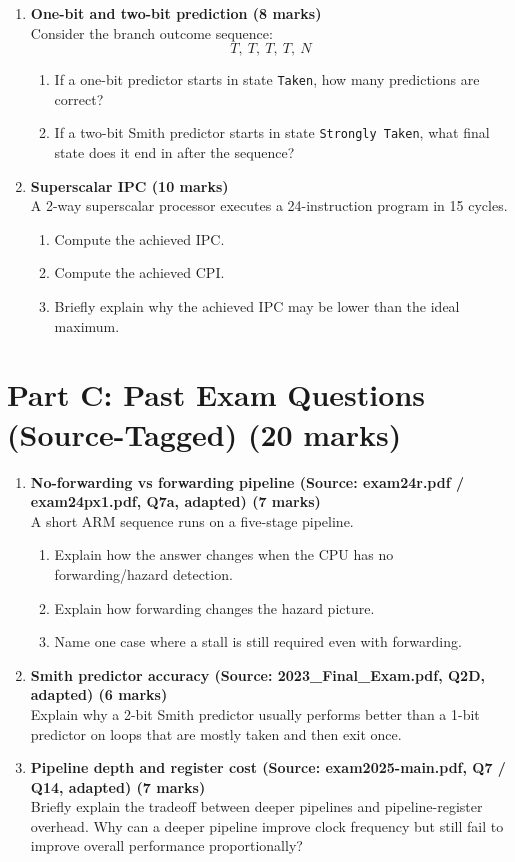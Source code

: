 \documentclass[11pt]{article}
\begin{document}
\begin{enumerate}[label=\textbf{B\arabic*.}]
  \item \textbf{One-bit and two-bit prediction (8 marks)}\\
  Consider the branch outcome sequence:
  \[
    T,\ T,\ T,\ T,\ N
  \]
  \begin{enumerate}[label=(\alph*)]
    \item If a one-bit predictor starts in state \texttt{Taken}, how many predictions are correct?
    \item If a two-bit Smith predictor starts in state \texttt{Strongly Taken}, what final state does it end in after the sequence?
  \end{enumerate}

  \item \textbf{Superscalar IPC (10 marks)}\\
  A 2-way superscalar processor executes a 24-instruction program in 15 cycles.
  \begin{enumerate}[label=(\alph*)]
    \item Compute the achieved IPC.
    \item Compute the achieved CPI.
    \item Briefly explain why the achieved IPC may be lower than the ideal maximum.
  \end{enumerate}
\end{enumerate}

\section*{Part C: Past Exam Questions (Source-Tagged) (20 marks)}
\begin{enumerate}[label=\textbf{C\arabic*.}]
  \item \textbf{No-forwarding vs forwarding pipeline (Source: exam24r.pdf / exam24px1.pdf, Q7a, adapted) (7 marks)}\\
  A short ARM sequence runs on a five-stage pipeline.
  \begin{enumerate}[label=(\alph*)]
    \item Explain how the answer changes when the CPU has no forwarding/hazard detection.
    \item Explain how forwarding changes the hazard picture.
    \item Name one case where a stall is still required even with forwarding.
  \end{enumerate}

  \item \textbf{Smith predictor accuracy (Source: 2023\_Final\_Exam.pdf, Q2D, adapted) (6 marks)}\\
  Explain why a 2-bit Smith predictor usually performs better than a 1-bit predictor on loops that are mostly taken and then exit once.

  \item \textbf{Pipeline depth and register cost (Source: exam2025-main.pdf, Q7 / Q14, adapted) (7 marks)}\\
  Briefly explain the tradeoff between deeper pipelines and pipeline-register overhead. Why can a deeper pipeline improve clock frequency but still fail to improve overall performance proportionally?
\end{enumerate}
\end{document}

